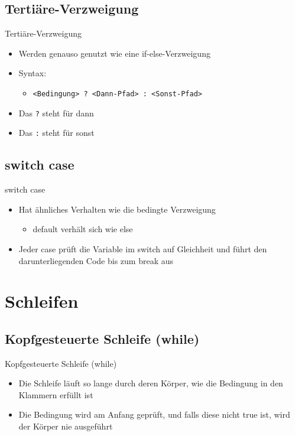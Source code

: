 \subsection{Tertiäre-Verzweigung}
\begin{frame}{Tertiäre-Verzweigung}
	\begin{itemize}
		\item Werden genauso genutzt wie eine if-else-Verzweigung
		\item Syntax:
		\begin{itemize}
			\item \texttt{\alert{<Bedingung>} ? \alert{<Dann-Pfad>} : \alert{<Sonst-Pfad>}}
		\end{itemize}
		\item Das \alert{\texttt{?}} steht für \alert{dann}
		\item Das \alert{\texttt{:}} steht für \alert{sonst}
	\end{itemize}		
	
\end{frame}

\subsection{switch case}
\begin{frame}{switch case}
	\begin{itemize}
		\item Hat ähnliches Verhalten wie die bedingte Verzweigung
		\begin{itemize}
			\item \alert{default} verhält sich wie \alert{else}
		\end{itemize}
		\item Jeder \alert{case} prüft die Variable im \alert{switch} auf Gleichheit und führt den darunterliegenden Code bis zum \alert{break} aus
	\end{itemize}
	
\end{frame}

\section{Schleifen}
\subsection{Kopfgesteuerte Schleife (while)}
\begin{frame}{Kopfgesteuerte Schleife (while)}
	\begin{itemize}
		\item Die Schleife läuft so lange durch deren Körper, wie die Bedingung in den Klammern erfüllt ist
		\item Die Bedingung wird am Anfang geprüft, und falls diese nicht \alert{true} ist, wird der Körper nie ausgeführt
	\end{itemize}
		
\end{frame}

